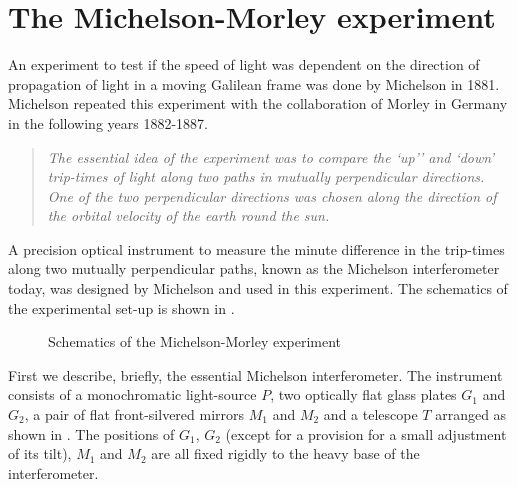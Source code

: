 \vspace{-.2cm}

\section{The Michelson-Morley experiment}
An experiment to test if the speed of light was dependent 
on the direction of propagation of light in a moving 
Galilean frame was done by Michelson in 1881. Michelson 
repeated this experiment with the collaboration of Morley 
in Germany in the following years 1882-1887.  

\begin{quote}
\textsl{The essential idea of the experiment was to compare 
the `up'' and `down' trip-times of light along two paths in 
mutually perpendicular directions. One of the two 
perpendicular directions was chosen along the direction of 
the orbital velocity of the earth round the sun.}
\end{quote}

A precision optical instrument to measure the minute  
difference in the trip-times along two mutually 
perpendicular paths, known as the Michelson interferometer  
today, was designed by  Michelson and used in this 
experiment. The schematics of the experimental set-up is 
shown in . 

\newpage

\begin{figure}[H]
\centering
{}
\caption{Schematics of the Michelson-Morley experiment} 
\label{fig3.1}
\end{figure}

First we describe, briefly, the essential Michelson 
interferometer. The instrument consists of a monochromatic 
light-source $P$, two optically flat glass plates $G_1$ and 
$G_2$, a pair of  flat front-silvered mirrors $M_1$ and 
$M_2$ and a telescope $T$ arranged as shown in 
. The positions of $G_1$,  $G_2$ (except for 
a provision for a small adjustment of its tilt), $M_1$ and 
$M_2$ are all fixed rigidly to the heavy base of the 
interferometer.  

